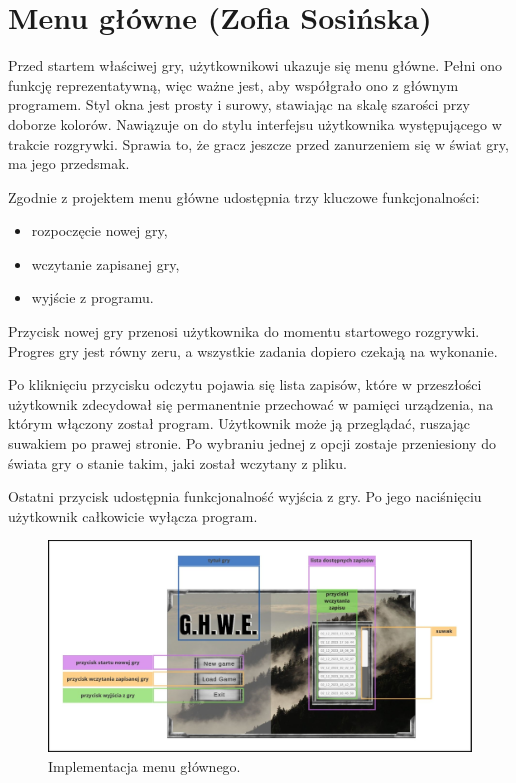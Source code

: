 \section{Menu główne (Zofia Sosińska)}\label{chap:menu_main_impl}
Przed startem właściwej gry, użytkownikowi ukazuje się menu główne. Pełni ono funkcję reprezentatywną, więc ważne jest, aby współgrało ono z głównym programem.
Styl okna jest prosty i surowy, stawiając na skalę szarości przy doborze kolorów. Nawiązuje on do stylu interfejsu użytkownika występującego 
w trakcie rozgrywki. Sprawia to, że gracz jeszcze przed zanurzeniem się w świat gry, ma jego przedsmak.

Zgodnie z projektem menu główne udostępnia trzy kluczowe funkcjonalności:
\begin{itemize}
    \item rozpoczęcie nowej gry,
    \item wczytanie zapisanej gry,
    \item wyjście z programu.
\end{itemize}

Przycisk nowej gry przenosi użytkownika do momentu startowego rozgrywki. Progres gry jest równy zeru, a wszystkie zadania dopiero czekają na wykonanie.

Po kliknięciu przycisku odczytu pojawia się lista zapisów, które w przeszłości użytkownik zdecydował się permanentnie przechować w pamięci urządzenia, na którym
włączony został program. Użytkownik może ją przeglądać, ruszając suwakiem po prawej stronie. Po wybraniu jednej z opcji zostaje przeniesiony 
do świata gry o stanie takim, jaki został wczytany z pliku.

Ostatni przycisk udostępnia funkcjonalność wyjścia z gry. Po jego naciśnięciu użytkownik całkowicie wyłącza program.
\begin{figure}[htbp]
    \centering
    \includegraphics[width=1.0\textwidth]{images/ui/main_menu.png}
    \caption{Implementacja menu głównego.
    }\label{fig:compass}
\end{figure}
